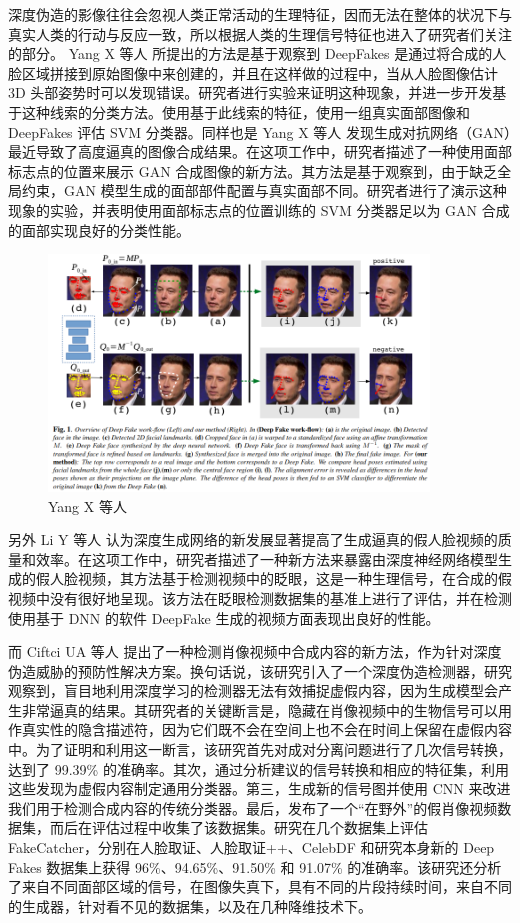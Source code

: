 深度伪造的影像往往会忽视人类正常活动的生理特征，因而无法在整体的状况下与真实人类的行动与反应一致，所以根据人类的生理信号特征也进入了研究者们关注的部分。 Yang X 等人 \cite{yang2019exposing} 所提出的方法是基于观察到 DeepFakes 是通过将合成的人脸区域拼接到原始图像中来创建的，并且在这样做的过程中，当从人脸图像估计 3D 头部姿势时可以发现错误。研究者进行实验来证明这种现象，并进一步开发基于这种线索的分类方法。使用基于此线索的特征，使用一组真实面部图像和 DeepFakes 评估 SVM 分类器。同样也是 Yang X 等人 \cite{yang2019exposing} 发现生成对抗网络（GAN）最近导致了高度逼真的图像合成结果。在这项工作中，研究者描述了一种使用面部标志点的位置来展示 GAN 合成图像的新方法。其方法是基于观察到，由于缺乏全局约束，GAN 模型生成的面部部件配置与真实面部不同。研究者进行了演示这种现象的实验，并表明使用面部标志点的位置训练的 SVM 分类器足以为 GAN 合成的面部实现良好的分类性能。

\begin{figure}[htb]
\centering 
\includegraphics[width=0.90\textwidth]{img/ch3m7.png} 
\caption{Yang X 等人 \cite{yang2019exposing}}
\label{Test}
\end{figure}

另外 Li Y 等人 \cite{liy2018exposingaicreated} 认为深度生成网络的新发展显著提高了生成逼真的假人脸视频的质量和效率。在这项工作中，研究者描述了一种新方法来暴露由深度神经网络模型生成的假人脸视频，其方法基于检测视频中的眨眼，这是一种生理信号，在合成的假视频中没有很好地呈现。该方法在眨眼检测数据集的基准上进行了评估，并在检测使用基于 DNN 的软件 DeepFake 生成的视频方面表现出良好的性能。

而 Ciftci UA 等人 \cite{ciftci2020fakecatcher} 提出了一种检测肖像视频中合成内容的新方法，作为针对深度伪造威胁的预防性解决方案。换句话说，该研究引入了一个深度伪造检测器，研究观察到，盲目地利用深度学习的检测器无法有效捕捉虚假内容，因为生成模型会产生非常逼真的结果。其研究者的关键断言是，隐藏在肖像视频中的生物信号可以用作真实性的隐含描述符，因为它们既不会在空间上也不会在时间上保留在虚假内容中。为了证明和利用这一断言，该研究首先对成对分离问题进行了几次信号转换，达到了 99.39\% 的准确率。其次，通过分析建议的信号转换和相应的特征集，利用这些发现为虚假内容制定通用分类器。第三，生成新的信号图并使用 CNN 来改进我们用于检测合成内容的传统分类器。最后，发布了一个“在野外”的假肖像视频数据集，而后在评估过程中收集了该数据集。研究在几个数据集上评估 FakeCatcher，分别在人脸取证、人脸取证++、CelebDF 和研究本身新的 Deep Fakes 数据集上获得 96\%、94.65\%、91.50\% 和 91.07\% 的准确率。该研究还分析了来自不同面部区域的信号，在图像失真下，具有不同的片段持续时间，来自不同的生成器，针对看不见的数据集，以及在几种降维技术下。

